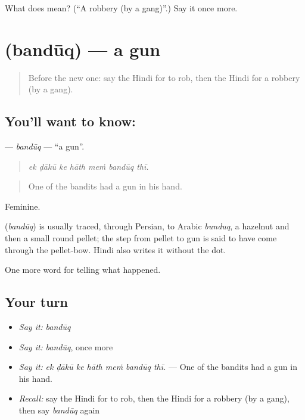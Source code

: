 \begin{tcolorbox}[breakable,colback=teal!4,colframe=teal!35!black,title={Before you move on}]
What does  mean? (\textquotedblleft{}A robbery (by a gang)\textquotedblright{}.) Say it once more.
\end{tcolorbox}
\section[\texorpdfstring{\hi{बंदूक़} (bandūq)}{बंदूक़ (bandūq)}]{ (bandūq) — a gun}

\label{lesson:HI-C292-banduq}



\begin{quote}
Before the new one: say the Hindi for to rob, then the Hindi for a robbery (by a gang).
\end{quote}

\subsection*{You'll want to know: }
\textbf{} — \emph{bandūq} — \textquotedblleft{}a gun\textquotedblright{}.

\begin{quote}
      
\end{quote}

\begin{quote}
\emph{ek ḍākū ke hāth meṁ bandūq thī.}
\end{quote}

\begin{quote}
One of the bandits had a gun in his hand.
\end{quote}

Feminine.

\begin{cousinweb}
\textbf{} (\emph{bandūq}) is usually traced, through Persian, to Arabic \emph{bunduq}, a hazelnut and then a small round pellet; the step from pellet to gun is said to have come through the pellet-bow. Hindi also writes it without the dot.
\end{cousinweb}

\begin{grammarlens}[title={What you've built}]
One more word for telling what happened.
\end{grammarlens}

\subsection*{Your turn}
\begin{itemize}
\raggedright
  \item \emph{Say it:} \emph{bandūq}
  \item \emph{Say it:} \emph{bandūq}, once more
  \item \emph{Say it:} \emph{ek ḍākū ke hāth meṁ bandūq thī.} — One of the bandits had a gun in his hand.
  \item \emph{Recall:} say the Hindi for to rob, then the Hindi for a robbery (by a gang), then say \emph{bandūq} again
\end{itemize}

